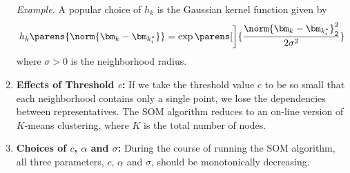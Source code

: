 \documentclass[12pt]{article}
\begin{document}
\begin{enumerate}[label=\textbf{\arabic*.}]
	\textit{Example.} A popular choice of $h_{k}$ is the Gaussian kernel function given by 
	\begin{align*}
		h_k \parens{\norm{\bm_k - \bm_{k_i^*}}} = \exp \parens[\bigg]{\frac{\norm{\bm_k - \bm_{k_i^*}}_2^2}{2 \sigma^2}}
	\end{align*}
	where $\sigma > 0$ is the neighborhood radius. 
	
	\item \textbf{Effects of Threshold $c$:} If we take the threshold value $c$ to be so small that each neighborhood contains only a single point, we lose the dependencies between representatives. The SOM algorithm reduces to an on-line version of $K$-means clustering, where $K$ is the total number of nodes. 
	
	\item \textbf{Choices of $c$, $\alpha$ and $\sigma$:} During the course of running the SOM algorithm, all three parameters, $c$, $\alpha$ and $\sigma$, should be monotonically decreasing. 
	
\end{enumerate}

\printbibliography
\end{document}
